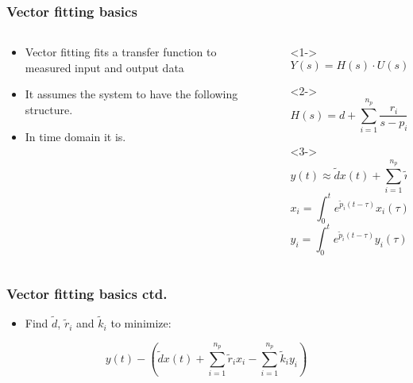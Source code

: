 \begin{frame}
	\frametitle{Vector fitting basics}
	\begin{columns}[c]
		\begin{column}{0.4\textwidth}
			\begin{itemize}
				\item<1-> Vector fitting fits a transfer function to measured input and output data
				\item<2-> It assumes the system to have the following structure.
				\item<3-> In time domain it is.
			\end{itemize}
		\end{column}
		\begin{column}{0.6\textwidth}
			\begin{itemize}
				\item[]<1->
					\begin{equation}
						Y(s) = H(s)\cdot U(s)
					\end{equation}
				\item[]<2->
					\begin{equation}
						H(s) = d + \sum^{n_p}_{i=1}\frac{r_i}{s-p_i}
					\end{equation}
				\item[]<3->
					\begin{equation}\label{eq:VFTD}
   			 			y(t) \approx \tilde{d} x(t) + \sum^{n_p}_{i=1} \tilde{r}_ix_i-\sum^{n_p}_{i=1}\tilde{k}_iy_i
					\end{equation}
					\begin{equation}\label{eq:XVFWave}
    					x_i = \int^t_0 e^{\tilde{p}_i(t-\tau)}x_i(\tau)d\tau
					\end{equation}
					\begin{equation}\label{eq:YVFWave}
    					y_i = \int^t_0 e^{\tilde{p}_{i}(t-\tau)}y_i(\tau)d\tau
					\end{equation}
			\end{itemize}
		\end{column}
	\end{columns}
\end{frame}
\begin{frame}
	\frametitle{Vector fitting basics ctd.}
	\begin{itemize}
		\item Find $\tilde{d}$, $\tilde{r}_i$ and $\tilde{k}_i$ to minimize:
	\end{itemize}
	\begin{equation}
		y(t) - (\tilde{d} x(t) + \sum^{n_p}_{i=1} \tilde{r}_ix_i-\sum^{n_p}_{i=1}\tilde{k}_iy_i)
	\end{equation}
\end{frame}
